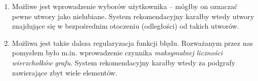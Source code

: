 \documentclass[a4paper,10pt]{article}
\begin{document}
\begin{enumerate}
  \item Możliwe jest wprowadzenie wyborów użytkownika -- mógłby on oznaczać pewne utwory jako nielubiane. System rekomendacyjny karałby wtedy utwory znajdujące się w bezpośrednim otoczeniu (odległości) od takich utworów.
  \item Możliwa jest także dalsza regularyzacja funkcji błędu. Rozważanym przez nas pomysłem było m.in. wprowadzenie czynnika \textit{maksymalnej liczności wierzchołków grafu}. System rekomendacyjny karałby wtedy za podgrafy zawierające zbyt wiele elementów.
\end{enumerate}
\end{document}
